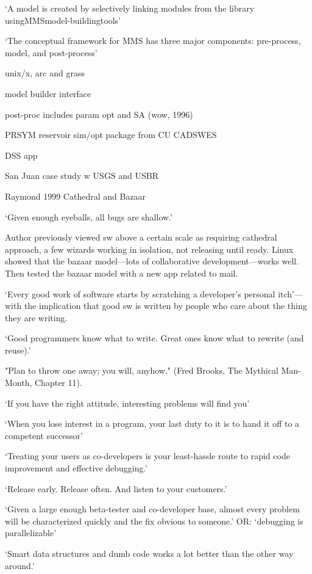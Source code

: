 \documentclass[12pt]{amsart}
\begin{document}
`A model is created by selectively linking modules from the library usingMMSmodel-buildingtools'

`The conceptual framework for MMS has three major components: pre-process, model, and post-process'

unix/x, arc and grass

model builder interface

post-proc includes param opt and SA (wow, 1996)

PRSYM reservoir sim/opt package from CU CADSWES

DSS app

San Juan case study w USGS and USBR








Raymond 1999 Cathedral and Bazaar

`Given enough eyeballs, all bugs are shallow.'

Author previously viewed sw above a certain scale as requiring cathedral approach, a few wizards working in isolation, not releasing until ready. Linux showed that the bazaar model---lots of collaborative development---works well. Then tested the bazaar model with a new app related to mail.

`Every good work of software starts by scratching a developer's personal itch'---with the implication that good sw is written by people who care about the thing they are writing.

`Good programmers know what to write. Great ones know what to rewrite (and reuse).'

"Plan to throw one away; you will, anyhow." (Fred Brooks, The Mythical Man- Month, Chapter 11).

`If you have the right attitude, interesting problems will find you'

`When you lose interest in a program, your last duty to it is to hand it off to a competent successor'

`Treating your users as co-developers is your least-hassle route to rapid code improvement and effective debugging.'

`Release early. Release often. And listen to your customers.'

`Given a large enough beta-tester and co-developer base, almost every problem will be characterized quickly and the fix obvious to someone.' OR: `debugging is parallelizable'

`Smart data structures and dumb code works a lot better than the other way around.'
\end{document}
